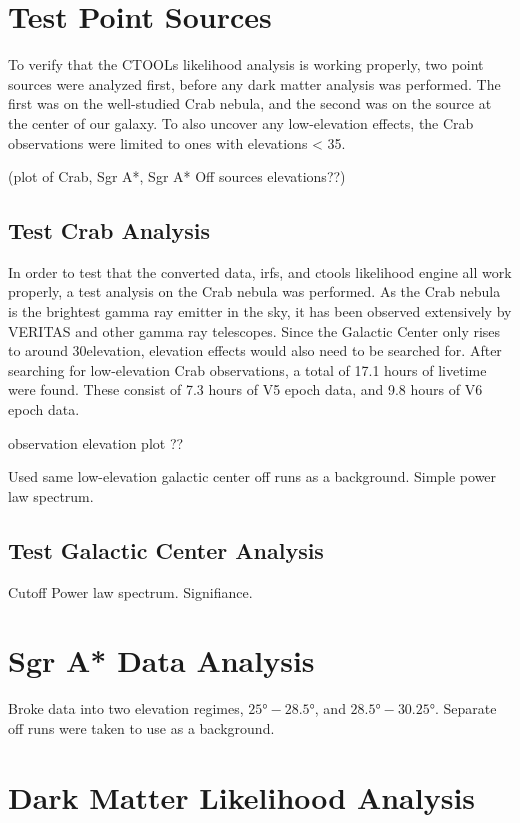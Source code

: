 \section{Test Point Sources}
To verify that the CTOOLs likelihood analysis is working properly, two point sources were analyzed first, before any dark matter analysis was performed.
The first was on the well-studied Crab nebula, and the second was on the source at the center of our galaxy.
To also uncover any low-elevation effects, the Crab observations were limited to ones with elevations < 35\degree.

(plot of Crab, Sgr A*, Sgr A* Off sources elevations??)

\subsection{Test Crab Analysis}

In order to test that the converted data, irfs, and ctools likelihood engine all work properly, a test analysis on the Crab nebula was performed.
As the Crab nebula is the brightest gamma ray emitter in the sky, it has been observed extensively by VERITAS and other gamma ray telescopes.
Since the Galactic Center only rises to around 30\degree elevation, elevation effects would also need to be searched for.
After searching for low-elevation Crab observations, a total of 17.1 hours of livetime were found.
These consist of 7.3 hours of V5 epoch data, and 9.8 hours of V6 epoch data.

observation elevation plot ??




Used same low-elevation galactic center off runs as a background.
Simple power law spectrum.

\subsection{Test Galactic Center Analysis}

Cutoff Power law spectrum.
Signifiance.

\section{Sgr A* Data Analysis}
Broke data into two elevation regimes, $ \ang{25}-\ang{28.5} $, and $ \ang{28.5}-\ang{30.25} $.
Separate off runs were taken to use as a background.


\section{Dark Matter Likelihood Analysis}

